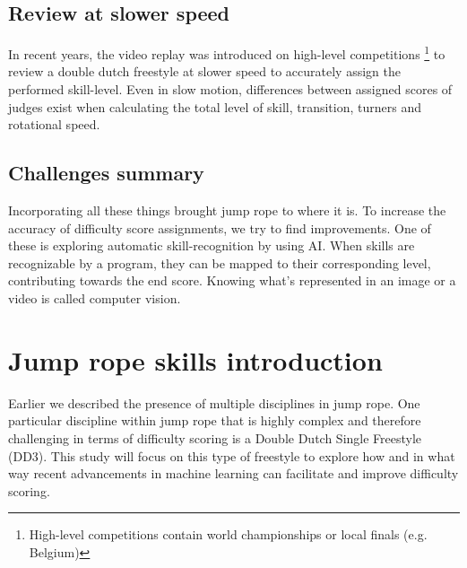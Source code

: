 \subsection{Review at slower speed}
In recent years, the video replay was introduced on high-level competitions \footnote{High-level competitions contain world championships or local finals (e.g. Belgium)} to review a double dutch freestyle at slower speed to accurately assign the performed skill-level.
Even in slow motion, differences between assigned scores of judges exist when calculating the total level of skill, transition, turners and rotational speed.

\subsection{Challenges summary}
Incorporating all these things brought jump rope to where it is. To increase the accuracy of difficulty score assignments, we try to find improvements. One of these is exploring automatic skill-recognition by using AI. When skills are recognizable by a program, they can be mapped to their corresponding level, contributing towards the end score. Knowing what's represented in an image or a video is called computer vision. %

\section{Jump rope skills introduction}
\label{lit:jump-rope-skills-introduction}

Earlier we described the presence of multiple disciplines in jump rope. One particular discipline within jump rope that is highly complex and therefore challenging in terms of difficulty scoring is a Double Dutch Single Freestyle (DD3). This study will focus on this type of freestyle to explore how and in what way recent advancements in machine learning can facilitate and improve difficulty scoring.

\medskip


